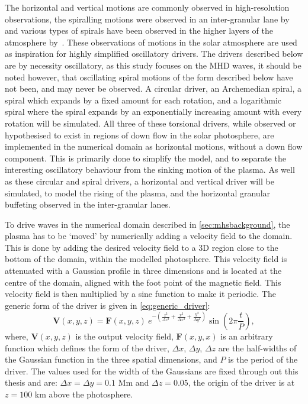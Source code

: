 \documentclass[a4paper,12pt,fourier,authoryear,custommargin]{Classes/PhDThesisPSnPDF}
\renewcommand{\vec}{\mathbf}
\begin{document}
The horizontal and vertical motions are commonly observed in high-resolution observations, the spiralling motions were observed in an inter-granular lane by~\cite{bonet2008, bonet2010} and various types of spirals have been observed in the higher layers of the atmosphere by~\cite{wedemeyer-bohm2009,wedemeyer-bohm2012,wedemeyer2013}.
These observations of motions in the solar atmosphere are used as inspiration for highly simplified oscillatory drivers.
The drivers described below are by necessity oscillatory, as this study focuses on the MHD waves, it should be noted however, that oscillating spiral motions of the form described below have not been, and may never be observed. 
A circular driver, an Archemedian spiral, a spiral which expands by a fixed amount for each rotation, and a logarithmic spiral where the spiral expands by an exponentially increasing amount with every rotation will be simulated.
All three of these torsional drivers, while observed or hypothesised to exist in regions of down flow in the solar photosphere, are implemented in the numerical domain as horizontal motions, without a down flow component.
This is primarily done to simplify the model, and to separate the interesting oscillatory behaviour from the sinking motion of the plasma.
As well as these circular and spiral drivers, a horizontal and vertical driver will be simulated, to model the rising of the plasma, and the horizontal granular buffeting observed in the inter-granular lanes.

To drive waves in the numerical domain described in \cref{sec:mhsbackground}, the plasma has to be `moved' by numerically adding a velocity field to the domain.
This is done by adding the desired velocity field to a 3D region close to the bottom of the domain, within the modelled photosphere.
This velocity field is attenuated with a Gaussian profile in three dimensions and is located at the centre of the domain, aligned with the foot point of the magnetic field.
This velocity field is then multiplied by a sine function to make it periodic. The generic form of the driver is given in \cref{eq:generic_driver}:
\begin{equation}
    \vec{V}(x,y,z) = \vec{F}(x,y,z) \ e^{-\left(\frac{z^2}{\Delta z^2} + \frac{x^2}{\Delta x^2} + \frac{y^2}{\Delta y^2}\right)} \sin \left(2\pi \frac{t}{P}\right),
    \label{eq:generic_driver}
\end{equation}
where, $\vec{V}(x,y,z)$ is the output velocity field, $\vec{F}(x,y,x)$ is an arbitrary function which defines the form of the driver, $\Delta x$, $\Delta y$, $\Delta z$ are the half-widths of the Gaussian function in the three spatial dimensions, and $P$ is the period of the driver.
The values used for the width of the Gaussians are fixed through out this thesis and are: $\Delta x = \Delta y = 0.1$ Mm and $\Delta z = 0.05$, the origin of the driver is at $z = 100$ km above the photosphere.
\end{document}
